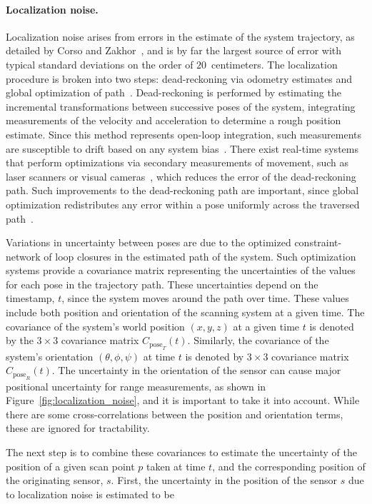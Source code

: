 \documentclass[12pt,onecolumn,oneside]{book}
\begin{document}
\paragraph*{Localization noise.}
Localization noise arises from errors in the estimate of the system trajectory, as detailed by Corso and Zakhor~\cite{NickJournal}, and is by far the largest source of error with typical standard deviations on the order of $20$~centimeters.  The localization procedure is broken into two steps: dead-reckoning via odometry estimates and global optimization of path~\cite{toro05,fastslam03}.  Dead-reckoning is performed by estimating the incremental transformations between successive poses of the system, integrating measurements of the velocity and acceleration to determine a rough position estimate.  Since this method represents open-loop integration, such measurements are susceptible to drift based on any system bias~\cite{Backpack,ProbabilisticRobotics}.  There exist real-time systems that perform optimizations via secondary measurements of movement, such as laser scanners or visual cameras~\cite{Shelley14}, which reduces the error of the dead-reckoning path.  Such improvements to the dead-reckoning path are important, since global optimization redistributes any error within a pose uniformly across the traversed path~\cite{toro07}.

Variations in uncertainty between poses are due to the optimized constraint-network of loop closures in the estimated path of the system.  Such optimization systems provide a covariance matrix representing the uncertainties of the values for each pose in the trajectory path.  These uncertainties depend on the timestamp, $t$, since the system moves around the path over time.  These values include both position and orientation of the scanning system at a given time.  The covariance of the system's world position $(x,y,z)$ at a given time $t$ is denoted by the $3 \times 3$ covariance matrix $C_{\mathrm{pose}_T}(t)$.  Similarly, the covariance of the system's orientation $(\theta,\phi,\psi)$ at time $t$ is denoted by $3 \times 3$ covariance matrix $C_{\mathrm{pose}_R}(t)$.  The uncertainty in the orientation of the sensor can cause major positional uncertainty for range measurements, as shown in Figure~\ref{fig:localization_noise}, and it is important to take it into account.  While there are some cross-correlations between the position and orientation terms, these are ignored for tractability.  

The next step is to combine these covariances to estimate the uncertainty of the position of a given scan point $p$ taken at time $t$, and the corresponding position of the originating sensor, $s$.  First, the uncertainty in the position of the sensor $s$ due to localization noise is estimated to be
\end{document}
